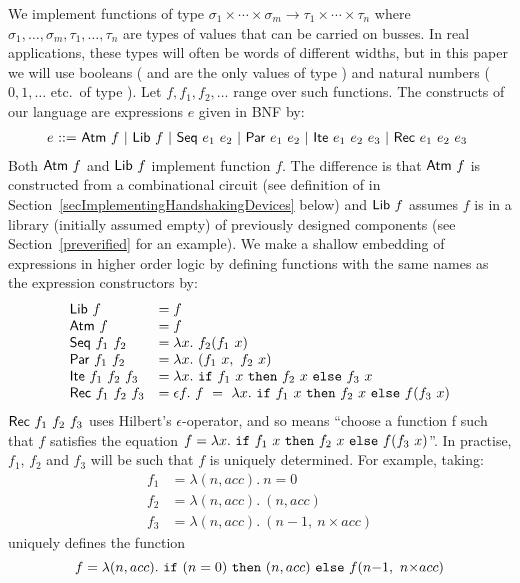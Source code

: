 \documentclass{llncs}
\begin{document}
We implement functions of type
$
\sigma_1\times\cdots\times\sigma_m \rightarrow \tau_1\times\cdots\times\tau_n
$
where $\sigma_1,\ldots,\sigma_m,\tau_1,\ldots,\tau_n$ are types of
values that can be carried on busses.  In real applications, these
types will often be words of different widths, but in this paper we
will use booleans ( and  are the only values of type
) and natural numbers ($0,1,\ldots$ etc.~of type ).
Let $f, f_1, f_2,\ldots$ range over such functions.   The constructs
of our language are expressions $e$ given in BNF by:
\[
\begin{array}{l}
   e\ \bnfDef\           \DEF{Atm}~f\ 
                  \bnfOR \DEF{Lib}~f\ 
                  \bnfOR \DEF{Seq}~e_1~e_2\ 
                  \bnfOR \DEF{Par}~e_1~e_2\ 
                  \bnfOR \DEF{Ite}~e_1~e_2~e_3\ 
                  \bnfOR \DEF{Rec}~e_1~e_2~e_3\ 
\end{array}
\]
Both $\mathsf{Atm}~f$ and $\mathsf{Lib}~f$ implement function $f$.  The
difference is that $\mathsf{Atm}~f$ is constructed from a combinational
circuit (see definition of \DEF{ATM} in Section~\ref{secImplementingHandshakingDevices}
below) and $\mathsf{Lib}~f$ assumes $f$ is in a library (initially
assumed empty) of previously designed components (see
Section~\ref{preverified} for an example). We make a
shallow embedding of expressions in higher order logic by defining functions with the
same names as the expression constructors by:
\[
\begin{array}{ll}
\mathsf{Lib}~f     &   = f\\
\mathsf{Atm}~f     &   = f\\
\mathsf{Seq}~f_1~f_2     &   = \lambda x.~f_2(f_1~x)\\
\mathsf{Par}~f_1~f_2     &   = \lambda x.~(f_1~x,~f_2~x)\\
\mathsf{Ite}~f_1~f_2~f_3 &   = \lambda x.~ \texttt{if}~f_1~x~\texttt{then}~f_2~x~\texttt{else}~f_3~x\\
\mathsf{Rec}~f_1~f_2~f_3 &   = \epsilon f.~f~=~\lambda x.~\texttt{if}~f_1~x~\texttt{then}~f_2~x~\texttt{else}~f(f_3~x)
\end{array}
\]
$\mathsf{Rec}~f_1~f_2~f_3$ uses
Hilbert's $\epsilon$-operator, and so means ``choose a function f such
that $f$ satisfies the equation $f = \lambda
x.~\texttt{if}~f_1~x~\texttt{then}~f_2~x~\texttt{else}~f(f_3~x)$''.
In practise, $f_1$, $f_2$ and $f_3$ will be such that $f$ is uniquely determined.
For example, taking:
\[
\begin{array}{ll}
 f_1 & = \lambda(n,acc).~n=0\\
 f_2 & = \lambda(n,acc).~(n,acc)\\
 f_3 & = \lambda(n,acc).~(n{-}1,~n{\times}acc)
\end{array}
\]
uniquely defines the function
\[
f=\lambda(n,acc).~\texttt{if}~(n=0)~\texttt{then}~(n,acc)~\texttt{else}~f(n{-}1,~n{\times}acc)
\]
\end{document}
